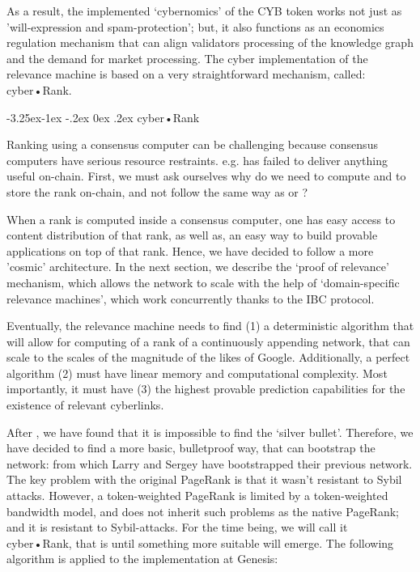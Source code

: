 \documentclass[8pt,oneside]{amsart}
\makeatletter
\newcommand{\linkred}[2]{\href{#1}{\color{red}{#2}}}
\newcommand{\linkgreen}[2]{\href{#1}{\color{green}{#2}}}
\renewcommand\subsection{\@startsection{subsection}{2}{\z@}%
                                     {-3.25ex\@plus -1ex \@minus -.2ex}%
                                     {0ex \@plus .2ex}%
                                     {\play\Large}}%
\newcommand{\titleSection}[1]{\subsection{#1}}
\newcommand{\code}[1]{{\PlayBold #1}}
\makeatother
\begin{document}
\begin{Abstract}
As a result, the implemented ‘cybernomics’ of the CYB token works not just as 'will-expression and spam-protection'; but, it also functions as an economics regulation mechanism that can align validators processing of the knowledge graph and the demand for market processing. The \code{cyber} implementation of the relevance machine is based on a very straightforward mechanism, called: cyber•Rank.

\titleSection{cyber•Rank}\label{cyberRank}

Ranking using a consensus computer can be challenging because consensus computers have serious resource restraints. e.g. \linkgreen{https://ipfs.io/ipfs/QmWTZjDZNbBqcJ5b6VhWGXBQ5EQavKKDteHsdoYqB5CBjh}{Nebulas} has failed to deliver anything useful on-chain. First, we must ask ourselves why do we need to compute and to store the rank on-chain, and not follow the same way as \linkgreen{https://ipfs.io/ipfs/QmZo7eY5UdJYotf3Z9GNVBGLjkCnE1j2fMdW2PgGCmvGPj}{Colony} or \linkgreen{https://ipfs.io/ipfs/QmTrxXp2xhB2zWGxhNoLgsztevqKLwpy5HwKjLjzFa7rnD}{Truebit}?

When a rank is computed inside a consensus computer, one has easy access to content distribution of that rank, as well as, an easy way to build provable applications on top of that rank. Hence, we have decided to follow a more 'cosmic' architecture. In the next section, we describe the ‘proof of relevance’ mechanism, which allows the network to scale with the help of ‘domain-specific relevance machines’, which work concurrently thanks to the IBC protocol.

Eventually, the relevance machine needs to find (1) a deterministic algorithm that will allow for computing of a rank of a continuously appending network, that can scale to the scales of the magnitude of the likes of Google. Additionally, a perfect algorithm (2) must have linear memory and computational complexity. Most importantly, it must have (3) the highest provable prediction capabilities for the existence of relevant cyberlinks.

After \linkred{https://arxiv.org/pdf/1709.09002.pdf}{some research}, we have found that it is impossible to find the ‘silver bullet’. Therefore, we have decided to find a more basic, bulletproof way, that can bootstrap the network: \linkred{http://ilpubs.stanford.edu:8090/422/1/1999-66.pdf}{the rank} from which Larry and Sergey have bootstrapped their previous network. The key problem with the original PageRank is that it wasn't resistant to Sybil attacks. However, a token-weighted PageRank is limited by a token-weighted bandwidth model, and does not inherit such problems as the native PageRank; and it is resistant to Sybil-attacks. For the time being, we will call it cyber•Rank, that is until something more suitable will emerge. The following algorithm is applied to the implementation at Genesis:


\end{Abstract}
\end{document}
